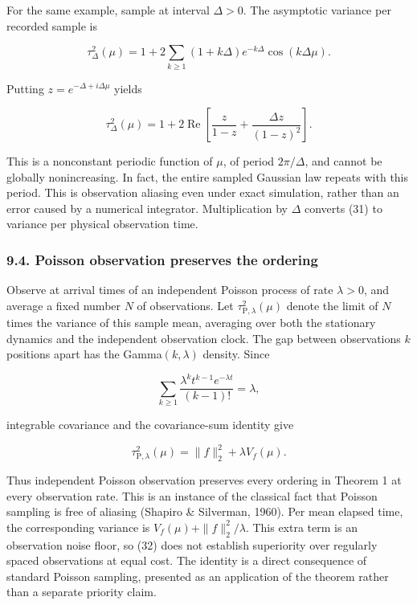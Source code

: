 \documentclass[
  british,
  11pt,
  a4paper,
]{article}
\begin{document}
For the same example, sample at interval \(\Delta>0\). The asymptotic
variance per recorded sample is

\[
\tau_\Delta^2(\mu)=1+2\sum_{k\ge1}(1+k\Delta)e^{-k\Delta}
\cos(k\Delta\mu).
\]

Putting \(z=e^{-\Delta+i\Delta\mu}\) yields

\[
\tau_\Delta^2(\mu)=1+2\mathop{\mathrm{Re}}\left[
\frac z{1-z}+\frac{\Delta z}{(1-z)^2}\right]. \tag{31}
\]

This is a nonconstant periodic function of \(\mu\), of period
\(2\pi/\Delta\), and cannot be globally nonincreasing. In fact, the
entire sampled Gaussian law repeats with this period. This is
observation aliasing even under exact simulation, rather than an error
caused by a numerical integrator. Multiplication by \(\Delta\) converts
(31) to variance per physical observation time.

\subsubsection{9.4. Poisson observation preserves the
ordering}\label{poisson-observation-preserves-the-ordering}

Observe at arrival times of an independent Poisson process of rate
\(\lambda>0\), and average a fixed number \(N\) of observations. Let
\(\tau_{\mathrm P,\lambda}^2(\mu)\) denote the limit of \(N\) times the
variance of this sample mean, averaging over both the stationary
dynamics and the independent observation clock. The gap between
observations \(k\) positions apart has the Gamma\((k,\lambda)\) density.
Since

\[
\sum_{k\ge1}\frac{\lambda^kt^{k-1}e^{-\lambda t}}{(k-1)!}=\lambda,
\]

integrable covariance and the covariance-sum identity give

\[
\boxed{\displaystyle
\tau_{\mathrm P,\lambda}^2(\mu)=\|f\|_2^2+\lambda V_f(\mu).} \tag{32}
\]

Thus independent Poisson observation preserves every ordering in Theorem
1 at every observation rate. This is an instance of the classical fact
that Poisson sampling is free of aliasing (Shapiro \& Silverman, 1960).
Per mean elapsed time, the corresponding variance is
\(V_f(\mu)+\|f\|_2^2/\lambda\). This extra term is an observation noise
floor, so (32) does not establish superiority over regularly spaced
observations at equal cost. The identity is a direct consequence of
standard Poisson sampling, presented as an application of the theorem
rather than a separate priority claim.
\end{document}
